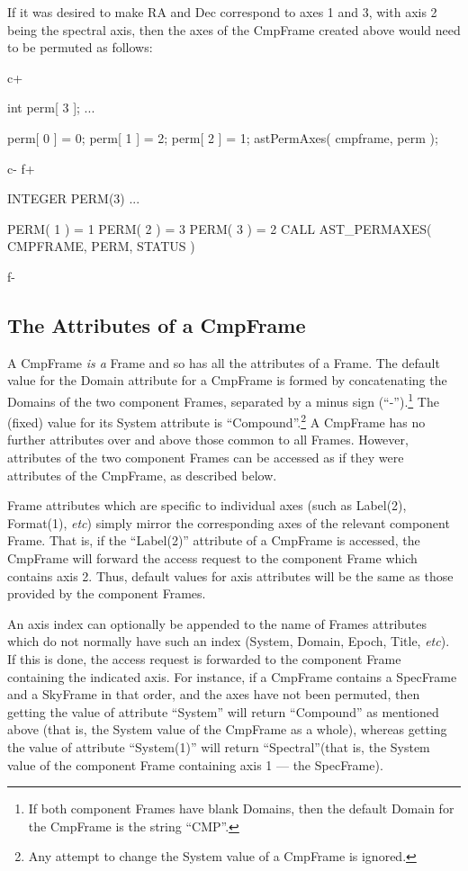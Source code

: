 \documentclass[twoside,11pt]{starlink}
\begin{document}
If it was desired to make RA and Dec correspond to axes 1 and 3, with
axis 2 being the spectral axis, then the axes of the CmpFrame created
above would need to be permuted as follows:

c+
\small
\begin{terminalv}
int perm[ 3 ];
...

perm[ 0 ] = 0;
perm[ 1 ] = 2;
perm[ 2 ] = 1;
astPermAxes( cmpframe, perm );
\end{terminalv}
\normalsize
c-
f+
\small
\begin{terminalv}
      INTEGER PERM(3)
      ...

      PERM( 1 ) = 1
      PERM( 2 ) = 3
      PERM( 3 ) = 2
      CALL AST_PERMAXES( CMPFRAME, PERM, STATUS )
\end{terminalv}
\normalsize
f-

\subsection{The Attributes of a CmpFrame}

A CmpFrame \emph{is a} Frame and so has all the attributes of a Frame.
The default value for the Domain attribute for a CmpFrame is formed by
concatenating the Domains of the two component Frames, separated by a
minus sign (``-'').\footnote{If both component Frames have blank Domains,
then the default Domain for the CmpFrame is the string ``CMP''.} The (fixed)
value for its System attribute is ``Compound''.\footnote{Any attempt to
change the System value of a CmpFrame is ignored.} A CmpFrame has no
further attributes over and above those common to all Frames. However,
attributes of the two component Frames can be accessed as if they were
attributes of the CmpFrame, as described below.

Frame attributes which are specific to individual axes (such as Label(2),
Format(1), \emph{etc}) simply mirror the corresponding axes of the
relevant component Frame. That is, if the ``Label(2)'' attribute of a
CmpFrame is accessed, the CmpFrame will forward the access request to the
component Frame which contains axis 2. Thus, default values for axis
attributes will be the same as those provided by the component Frames.

An axis index can optionally be appended to the name of Frames attributes
which do not normally have such an index (System, Domain, Epoch, Title,
\emph{etc}). If this is done, the access request is forwarded to the
component Frame containing the indicated axis. For instance, if a
CmpFrame contains a SpecFrame and a SkyFrame in that order, and the axes
have not been permuted, then getting the value of attribute ``System'' will
return  ``Compound'' as mentioned above (that is, the System value of the
CmpFrame as a whole), whereas getting the value of attribute
``System(1)'' will return ``Spectral''(that is, the System value of the
component Frame containing axis 1 --- the SpecFrame).
\end{document}
